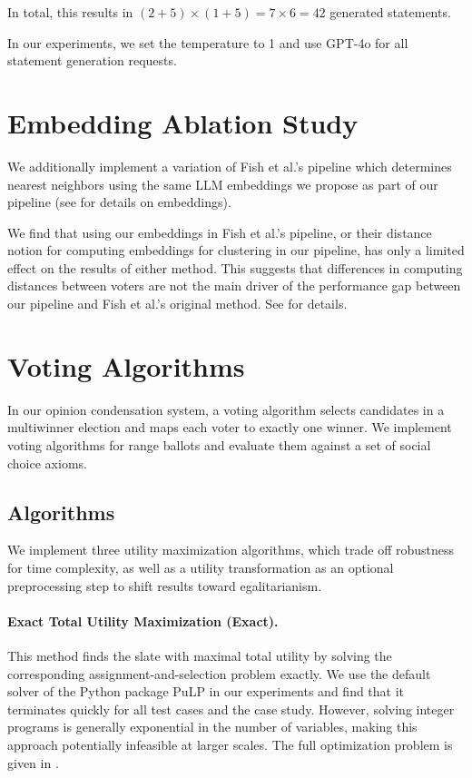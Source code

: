 \documentclass[11pt]{article}
\begin{document}
In total, this results in $(2 + 5) \times (1 + 5) = 7 \times 6 = 42$ generated statements.

In our experiments, we set the temperature to 1 and use GPT-4o for all statement generation requests.


\section{Embedding Ablation Study} \label{sec:embedding-ablation}

We additionally implement a variation of Fish et al.’s pipeline which determines nearest neighbors using the same LLM embeddings we propose as part of our pipeline (see  for details on embeddings).

We find that using our embeddings in Fish et al.’s pipeline, or their distance notion for computing embeddings for clustering in our pipeline, has only a limited effect on the results of either method. This suggests that differences in computing distances between voters are not the main driver of the performance gap between our pipeline and Fish et al.’s original method. See  for details.

\section{Voting Algorithms} \label{sec:voting-algorithms}

In our opinion condensation system, a voting algorithm selects candidates in a multiwinner election and maps each voter to exactly one winner. We implement voting algorithms for range ballots and evaluate them against a set of social choice axioms.

\subsection{Algorithms} \label{sec:algorithms}

We implement three utility maximization algorithms, which trade off robustness for time complexity, as well as a utility transformation as an optional preprocessing step to shift results toward egalitarianism.

\paragraph{Exact Total Utility Maximization (Exact).}
This method finds the slate with maximal total utility by solving the corresponding assignment-and-selection problem exactly. We use the default solver of the Python package PuLP in our experiments and find that it terminates quickly for all test cases and the case study. However, solving integer programs is generally exponential in the number of variables, making this approach potentially infeasible at larger scales. The full optimization problem is given in .
\end{document}
